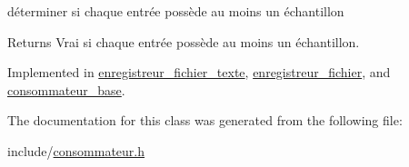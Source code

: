 déterminer si chaque entrée possède au moins un échantillon 

\begin{DoxyReturn}{Returns}
Vrai si chaque entrée possède au moins un échantillon. 
\end{DoxyReturn}


Implemented in \hyperlink{classenregistreur__fichier__texte_ac412238ca34c019727aa6ddfbe9ae56e}{enregistreur\-\_\-fichier\-\_\-texte}, \hyperlink{classenregistreur__fichier_a1f20e9ef18665e9b3714d067b573a9de}{enregistreur\-\_\-fichier}, and \hyperlink{classconsommateur__base_a19f135d483c30324526d63c18a536f36}{consommateur\-\_\-base}.



The documentation for this class was generated from the following file\-:\begin{DoxyCompactItemize}
\item 
include/\hyperlink{consommateur_8h}{consommateur.\-h}\end{DoxyCompactItemize}
